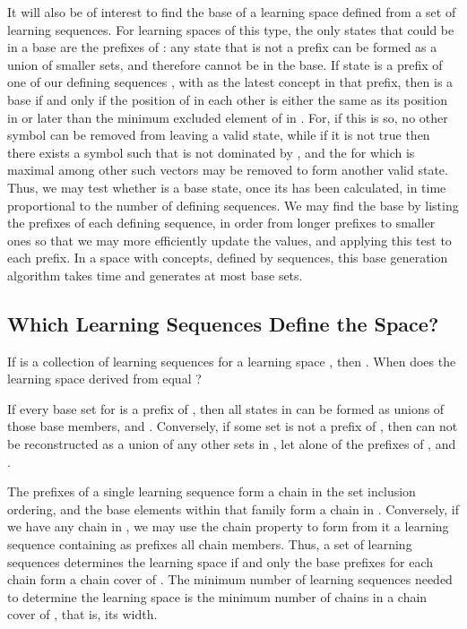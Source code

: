 \documentclass[11pt]{llncs}
\begin{document}
{It will also be of interest to find the base of a learning space  defined from a set  of learning sequences. For learning spaces of this type, the only states that could be in a base are the prefixes of : any state that is not a prefix can be formed as a union of smaller sets, and therefore cannot be in the base.
If state  is a prefix of one of our defining sequences , with  as the latest concept in that prefix, then  is a base if and only if the position of  in each other  is either the same as its position in  or later than the minimum excluded element of  in .
For, if this is so, no other symbol can be removed from  leaving a valid state, while if it is not true
then there exists a symbol  such that  is not dominated by , and the  for which   is maximal among other such vectors may be removed to form another valid state.
Thus, we may test whether  is a base state, once its  has been calculated,
in time proportional to the number of defining sequences.
We may find the base by listing the prefixes of each defining sequence, in order from longer prefixes to smaller ones so that we may more efficiently update the  values, and applying this test to each prefix. In a space with  concepts, defined by  sequences, this base generation algorithm takes time  and generates at most  base sets.

\subsection{Which Learning Sequences Define the Space?}

If  is a collection of learning sequences for a learning space ,
then .  When does the learning space  derived from  equal ?

If every base set for  is a prefix of , then all states in  can be formed as unions of those base members, and .  Conversely, if some set  is not a prefix of ,
then  can not be reconstructed as a union of any other sets in , let alone of the prefixes of , and .

The prefixes of a single learning sequence form a chain in the set inclusion ordering, and the base elements within that family form a chain in . Conversely, if we have any chain in , we may use the chain property to form from it a learning sequence containing as prefixes all chain members.  Thus, a set  of learning sequences determines the learning space  if and only the base prefixes for each chain form a chain cover of .
The minimum number of learning sequences needed to determine the learning space is the minimum number of chains in a chain cover of , that is, its width.

}
\end{document}
